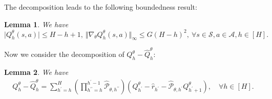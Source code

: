 \documentclass{article}
\newtheorem{lemma}{Lemma}[section]
\numberwithin{equation}{section}
\begin{document}
The decomposition leads to the following boundedness result: 
\begin{lemma}
\label{upbd}
We have $\vert Q_h^\theta(s,a)\vert\leq H-h+1,\ \Vert\nabla_\theta Q_h^\theta(s,a)\Vert_\infty\leq G(H-h)^2,\ \forall s\in\mathcal{S},a\in\mathcal{A},h\in[H].$
\end{lemma}
Now we consider the decomposition of $Q_h^\theta-\widehat{Q}_h^\theta$: 
\begin{lemma}
\label{Q_decomp}
We have 
\begin{align*}
    Q_h^\theta-\widehat{Q}_h^\theta=\sum_{h^\prime=h}^H\left(\prod_{h^{\prime\prime}=h}^{h^\prime-1}\widehat{\mathcal{P}}_{\theta,h^{\prime\prime}}\right)\left(Q_{h^\prime}^\theta-\widehat{r}_{h^\prime}- \widehat{\mathcal{P}}_{\theta,h^\prime}Q_{h^\prime+1}^\theta\right),\quad\forall h\in[H].
\end{align*}
\end{lemma}
\end{document}
